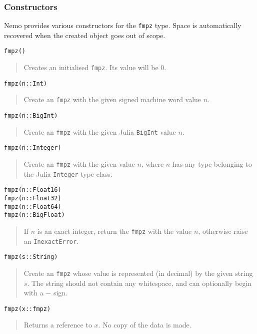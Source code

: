 \documentclass[a4paper,10pt]{article}
\newcommand{\code}{\lstinline}
\newcommand{\desc}[1]{\vspace{-3mm}\begin{quote}#1\end{quote}}
\begin{document}
\subsubsection{Constructors}

Nemo provides various constructors for the \code{fmpz} type. Space is automatically
recovered when the created object goes out of scope.

\begin{lstlisting}
fmpz()
\end{lstlisting}

\desc{Creates an initialised \code{fmpz}. Its value will be $0$.}

\begin{lstlisting}
fmpz(n::Int)
\end{lstlisting}

\desc{Create an \code{fmpz} with the given signed machine word value $n$.}

\begin{lstlisting}
fmpz(n::BigInt)
\end{lstlisting}

\desc{Create an \code{fmpz} with the given Julia \code{BigInt} value $n$.}

\begin{lstlisting}
fmpz(n::Integer)
\end{lstlisting}

\desc{Create an \code{fmpz} with the given value $n$, where $n$ has any type belonging to the Julia
\code{Integer} type class.}

\begin{lstlisting}
fmpz(n::Float16)
fmpz(n::Float32)
fmpz(n::Float64)
fmpz(n::BigFloat)
\end{lstlisting}

\desc{If $n$ is an exact integer, return the \code{fmpz} with the value $n$, otherwise raise an
\code{InexactError}.}

\begin{lstlisting}
fmpz(s::String)
\end{lstlisting}

\desc{Create an \code{fmpz} whose value is represented (in decimal) by the given string
$s$. The string should not contain any whitespace, and can optionally begin with
a $-$ sign.}

\begin{lstlisting}
fmpz(x::fmpz)
\end{lstlisting}

\desc{Returns a reference to $x$. No copy of the data is made.}
\end{document}
